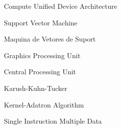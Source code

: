 \item [CUDA] Compute Unified Device Architecture
\item [SVM] Support Vector Machine
\item [MVS] Maquina de Vetores de Suport
\item [GPU]  Graphics Processing Unit
\item [CPU]  Central Processing Unit
\item [KTT] Karush-Kuhn-Tucker
\item [KAA] Kernel-Adatron Algorithm
\item [SIMD] Single Instruction Multiple Data